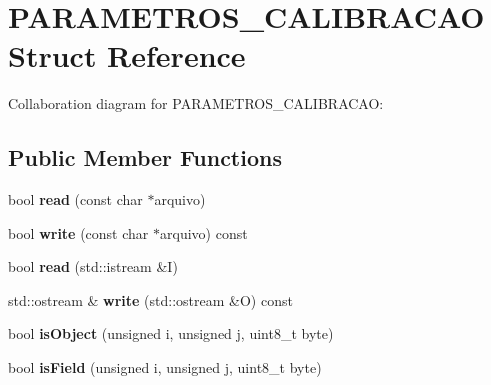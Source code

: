 \hypertarget{structPARAMETROS__CALIBRACAO}{}\section{P\+A\+R\+A\+M\+E\+T\+R\+O\+S\+\_\+\+C\+A\+L\+I\+B\+R\+A\+C\+AO Struct Reference}
\label{structPARAMETROS__CALIBRACAO}


Collaboration diagram for P\+A\+R\+A\+M\+E\+T\+R\+O\+S\+\_\+\+C\+A\+L\+I\+B\+R\+A\+C\+AO\+:
\subsection*{Public Member Functions}
\begin{DoxyCompactItemize}
\item 
bool {\bfseries read} (const char $\ast$arquivo)\hypertarget{structPARAMETROS__CALIBRACAO_a4a3afbad30d43890f521c0869d23019a}{}\label{structPARAMETROS__CALIBRACAO_a4a3afbad30d43890f521c0869d23019a}

\item 
bool {\bfseries write} (const char $\ast$arquivo) const \hypertarget{structPARAMETROS__CALIBRACAO_a99613a3aa4839e98fc6659d0d7238293}{}\label{structPARAMETROS__CALIBRACAO_a99613a3aa4839e98fc6659d0d7238293}

\item 
bool {\bfseries read} (std\+::istream \&I)\hypertarget{structPARAMETROS__CALIBRACAO_a337fa1a6c0fbf8e00d435d394142074c}{}\label{structPARAMETROS__CALIBRACAO_a337fa1a6c0fbf8e00d435d394142074c}

\item 
std\+::ostream \& {\bfseries write} (std\+::ostream \&O) const \hypertarget{structPARAMETROS__CALIBRACAO_ae1006a03d03ede5a871cd0f14ea4a7ac}{}\label{structPARAMETROS__CALIBRACAO_ae1006a03d03ede5a871cd0f14ea4a7ac}

\item 
bool {\bfseries is\+Object} (unsigned i, unsigned j, uint8\+\_\+t byte)\hypertarget{structPARAMETROS__CALIBRACAO_abe5e0899c102e5cd756dba0309b167c8}{}\label{structPARAMETROS__CALIBRACAO_abe5e0899c102e5cd756dba0309b167c8}

\item 
bool {\bfseries is\+Field} (unsigned i, unsigned j, uint8\+\_\+t byte)\hypertarget{structPARAMETROS__CALIBRACAO_a62ae78534cd3eb992bd9c265f7d1edc2}{}\label{structPARAMETROS__CALIBRACAO_a62ae78534cd3eb992bd9c265f7d1edc2}


\end{DoxyCompactItemize}
